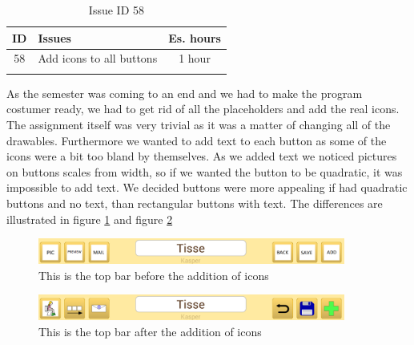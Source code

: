 \begin{longtable} { | c | p{12cm} | c | } 
\hline
	ID 	&	Issues	&		 Es. hours \\\hline
	58	&	Add icons to all buttons	&	1 hour	\\\hline
\caption{Issue ID 58}
\label{tab:spr4_iconstobuttons}
\end{longtable}

As the semester was coming to an end and we had to make the program costumer ready, we had to get rid of all the placeholders and add the real icons. The assignment itself was very trivial as it was a matter of changing all of the drawables. Furthermore we wanted to add text to each button as some of the icons were a bit too bland by themselves. As we added text we noticed pictures on buttons scales from width, so if we wanted the button to be quadratic, it was impossible to add text. We decided buttons were more appealing if had quadratic buttons and no text, than rectangular buttons with text. The differences are illustrated in figure \ref{fig:withoutIcons} and figure \ref{fig:withIcons}

\begin{figure} [h!]
\centering
\includegraphics[width=0.9\textwidth]{Pics/Sprint4/topbarshit/withoutIcons.png}
\caption{This is the top bar before the addition of icons}
\label{fig:withoutIcons}
\end{figure}

\begin{figure} [h!]
\centering
\includegraphics[width=0.9\textwidth]{Pics/Sprint4/topbarshit/withIcons.png}
\caption{This is the top bar after the addition of icons}
\label{fig:withIcons}
\end{figure}
